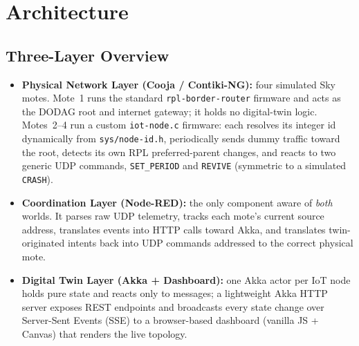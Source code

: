 \section{Architecture}

\subsection*{Three-Layer Overview}
\begin{itemize}
\item \textbf{Physical Network Layer (Cooja / Contiki-NG):} four simulated Sky motes.
  Mote~1 runs the standard \texttt{rpl-border-router} firmware and acts as the DODAG root
  and internet gateway; it holds no digital-twin logic. Motes~2--4 run a custom
  \texttt{iot-node.c} firmware: each resolves its integer id dynamically from
  \texttt{sys/node-id.h}, periodically sends dummy traffic toward the root, detects its own
  RPL preferred-parent changes, and reacts to two generic UDP commands, \texttt{SET\_PERIOD}
  and \texttt{REVIVE} (symmetric to a simulated \texttt{CRASH}).
\item \textbf{Coordination Layer (Node-RED):} the only component aware of \emph{both}
  worlds. It parses raw UDP telemetry, tracks each mote's current source address, translates
  events into HTTP calls toward Akka, and translates twin-originated intents back into UDP
  commands addressed to the correct physical mote.
\item \textbf{Digital Twin Layer (Akka + Dashboard):} one Akka actor per IoT node holds pure
  state and reacts only to messages; a lightweight Akka HTTP server exposes REST endpoints
  and broadcasts every state change over Server-Sent Events (SSE) to a browser-based
  dashboard (vanilla JS + Canvas) that renders the live topology.
\end{itemize}

